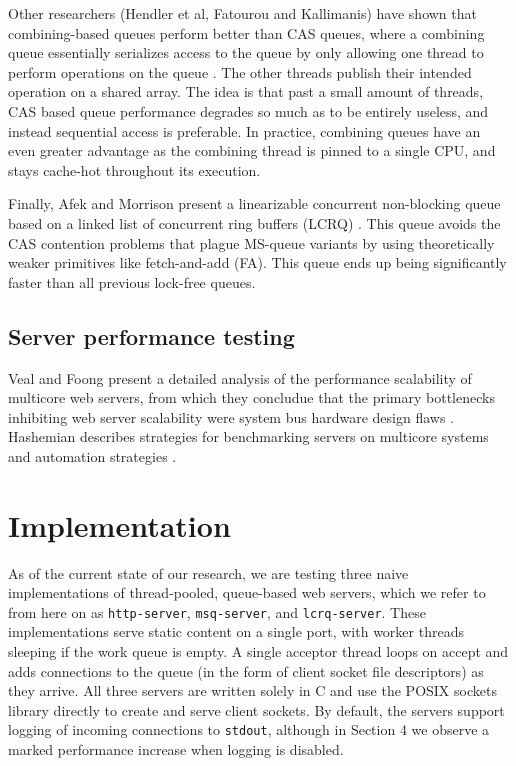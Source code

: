 \documentclass[twoside,10pt]{article}
\begin{document}
\begin{multicols}{2}
Other researchers (Hendler et al, Fatourou and Kallimanis) have shown
that combining-based queues perform better than CAS queues, where a
combining queue essentially serializes access to the queue by only
allowing one thread to perform operations on the queue \cite{He10,
  FK12}. The other threads publish their intended operation on a
shared array. The idea is that past a small amount of threads, CAS
based queue performance degrades so much as to be entirely useless,
and instead sequential access is preferable. In practice, combining
queues have an even greater advantage as the combining thread is
pinned to a single CPU, and stays cache-hot throughout its execution.

Finally, Afek and Morrison present a linearizable concurrent
non-blocking queue based on a linked list of concurrent ring buffers
(LCRQ) \cite{AM13}. This queue avoids the CAS contention problems that
plague MS-queue variants by using theoretically weaker primitives like
fetch-and-add (FA). This queue ends up being significantly faster than
all previous lock-free queues.

\subsection{Server performance testing}

Veal and Foong present a detailed analysis of the performance
scalability of multicore web servers, from which they concludue that
the primary bottlenecks inhibiting web server scalability were system
bus hardware design flaws \cite{veal2007performance}. Hashemian
describes strategies for benchmarking servers on multicore systems and
automation strategies \cite{hashemian2013improving}.

\section{Implementation}
As of the current state of our research, we are testing three naive
implementations of thread-pooled, queue-based web servers, which we
refer to from here on as \verb+http-server+, \verb+msq-server+, and
\verb+lcrq-server+. These implementations serve static content on a
single port, with worker threads sleeping if the work queue is
empty. A single acceptor thread loops on accept and adds connections
to the queue (in the form of client socket file descriptors) as they
arrive. All three servers are written solely in C and use the POSIX
sockets library directly to create and serve client sockets. By
default, the servers support logging of incoming connections to
\verb+stdout+, although in Section 4 we observe a marked performance
increase when logging is disabled.


\end{multicols}
\end{document}
